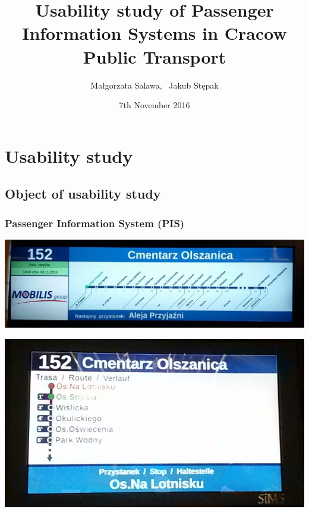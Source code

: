 \documentclass{beamer}
\title
[Usability study of Passenger Information Systems]
{Usability study of Passenger Information Systems in Cracow Public Transport}
\author
[M.Salawa, J. Stępak]
{Małgorzata Salawa, \ Jakub Stępak}
\institute
[AGH]
{
AGH University of Science and Technology

}
\date{7th November 2016}
\begin{document}
\frame{\titlepage}


\section{Usability study}

\subsection{Object of usability study}

\begin{frame}

\frametitle{Passenger Information System (PIS)}
\begin{center}

\includegraphics[width=0.8\paperwidth]{sip1.jpg}

\includegraphics[width=0.4\paperwidth]{sip2.jpg}

\end{center}

\end{frame}
\end{document}
